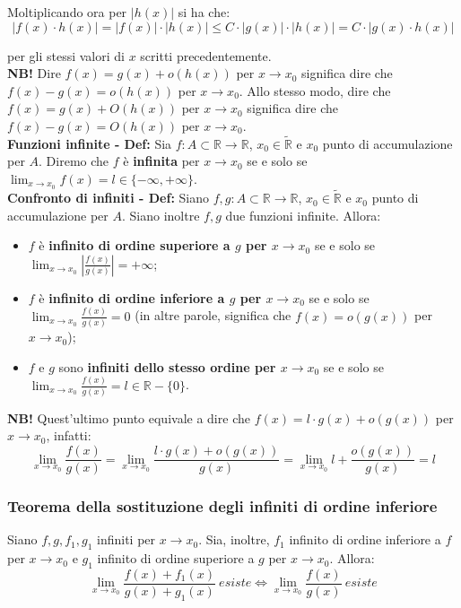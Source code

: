 \documentclass{article}
\begin{document}
\noindent Moltiplicando ora per $|h(x)|$ si ha che:
\begin{equation*}
    |f(x) \cdot h(x)| = |f(x)| \cdot |h(x)| \leq C \cdot |g(x)| \cdot |h(x)| = C \cdot |g(x) \cdot h(x)|
\end{equation*}

\noindent per gli stessi valori di $x$ scritti precedentemente.\\

\noindent\textbf{NB!} Dire $f(x) = g(x) + o(h(x))$ per $x \to x_0$ significa dire che $f(x) - g(x) = o(h(x))$ per $x \to x_0$. Allo stesso modo, dire che  $f(x) = g(x) + O(h(x))$ per $x \to x_0$ significa dire che $f(x) - g(x) = O(h(x))$ per $x \to x_0$. \\

\noindent\textbf{Funzioni infinite - Def:} Sia $f: A \subset \mathbb{R} \xrightarrow{} \mathbb{R}$, $x_0 \in \widetilde{\mathbb{R}}$ e $x_0$ punto di accumulazione per $A$. Diremo che $f$ è \textbf{infinita} per $x \to x_0$ se e solo se $\lim_{x \to x_0} f(x) = l \in \{-\infty, +\infty\}$.\\

\noindent\textbf{Confronto di infiniti - Def:} Siano $f, g: A \subset \mathbb{R} \xrightarrow{} \mathbb{R}$, $x_0 \in \widetilde{\mathbb{R}}$ e $x_0$ punto di accumulazione per $A$. Siano inoltre $f, g$ due funzioni infinite. Allora:
\begin{itemize}
    \item $f$ è \textbf{infinito di ordine superiore a $g$ per $x \to x_0$} se e solo se $\lim_{x \to x_0} \left|\frac{f(x)}{g(x)}\right| = +\infty$;
    \item $f$ è \textbf{infinito di ordine inferiore a $g$ per $x \to x_0$} se e solo se $\lim_{x \to x_0} \frac{f(x)}{g(x)} = 0$ (in altre parole, significa che $f(x) = o(g(x))$ per $x \to x_0$);
    \item $f$ e $g$ sono \textbf{infiniti dello stesso ordine per $x \to x_0$} se e solo se $\lim_{x \to x_0} \frac{f(x)}{g(x)} = l \in \mathbb{R} - \{0\}$.
\end{itemize}

\noindent\textbf{NB!} Quest'ultimo punto equivale a dire che $f(x) = l \cdot g(x) + o(g(x))$ per $x \to x_0$, infatti:
\begin{equation*}
    \lim_{x \to x_0} \frac{f(x)}{g(x)} = \lim_{x \to x_0} \frac{l \cdot g(x) + o(g(x))}{g(x)} = \lim_{x \to x_0} l + \frac{o(g(x))}{g(x)} = l
\end{equation*}

\subsubsection{Teorema della sostituzione degli infiniti di ordine inferiore}
Siano $f, g, f_1, g_1$ infiniti per $x \to x_0$. Sia, inoltre, $f_1$ infinito di ordine inferiore a $f$ per $x \to x_0$ e $g_1$ infinito di ordine superiore a $g$ per $x \to x_0$. Allora:
\begin{equation*}
    \lim_{x \to x_0} \frac{f(x) + f_1(x)}{g(x) + g_1(x)} \ esiste \iff \lim_{x \to x_0} \frac{f(x)}{g(x)} \ esiste
\end{equation*}
\end{document}
